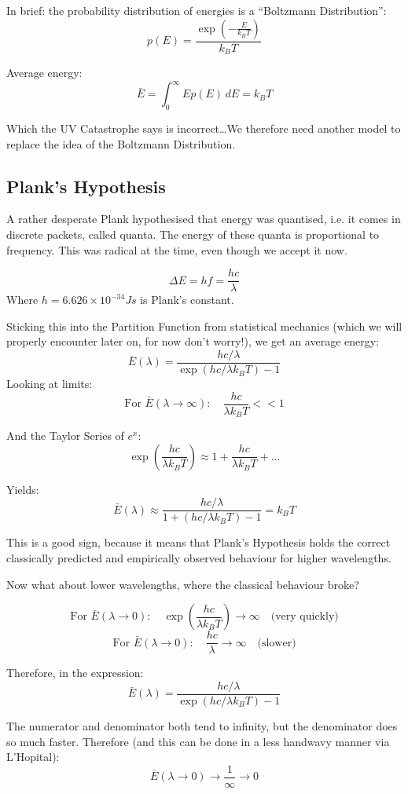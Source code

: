 In brief: the probability distribution of energies is a ``Boltzmann Distribution'':
\[
    p(E) = \frac{\exp \left(-\frac{E}{k_B T}\right)}{k_B T}
\]

Average energy:
\[
    \bar{E} = \int_{0}^{\infty} E p (E) \, dE = k_B T
\]

Which the UV Catastrophe says is incorrect\ldots We therefore need another model to replace the idea of the Boltzmann Distribution.
\subsection*{Plank's Hypothesis}
A rather desperate Plank hypothesised that energy was quantised, i.e. it comes in discrete packets, called quanta. The energy of these quanta is proportional to frequency. This was radical at the time, even though we accept it now.

\[
    \Delta E = hf = \frac{hc}{\lambda}
\]
Where $h = 6.626 \times 10^{-34}Js$ is Plank's constant.

Sticking this into the Partition Function from statistical mechanics (which we will properly encounter later on, for now don't worry!), we get an average energy:
\[
    \bar{E}(\lambda) = \frac{hc/\lambda}{\exp(hc / \lambda k_BT) - 1}
\]
Looking at limits:
\[
    \text{For } \bar{E}(\lambda \to \infty): \quad \frac{hc}{\lambda k_BT} << 1
\]

And the Taylor Series of $e^x$:
\[
    \exp \left(\frac{hc}{\lambda k_B T}\right) \approx 1 + \frac{hc}{\lambda k_B T} + \ldots
\]

Yields:
\[
    \bar{E}(\lambda) \approx \frac{hc / \lambda}{1 + (hc / \lambda k_B T) -1} = k_B T
\]

This is a good sign, because it means that Plank's Hypothesis holds the correct classically predicted and empirically observed behaviour for higher wavelengths.

Now what about lower wavelengths, where the classical behaviour broke?

\[
    \text{For } \bar{E}(\lambda \to 0): \quad \exp\left(\frac{hc}{\lambda k_BT}\right) \to \infty \quad \text{(very quickly)} 
\]
\[
    \text{For } \bar{E}(\lambda \to 0): \quad \frac{hc}{\lambda} \to \infty \quad \text{(slower)} 
\]


Therefore, in the expression:
\[
    \bar{E}(\lambda) = \frac{hc/\lambda}{\exp(hc / \lambda k_BT) - 1}
\]

The numerator and denominator both tend to infinity, but the denominator does so much faster. Therefore (and this can be done in a less handwavy manner via L'Hopital):
\[
    \bar{E}(\lambda \to 0) \to \frac{1}{\infty} \to 0
\]

